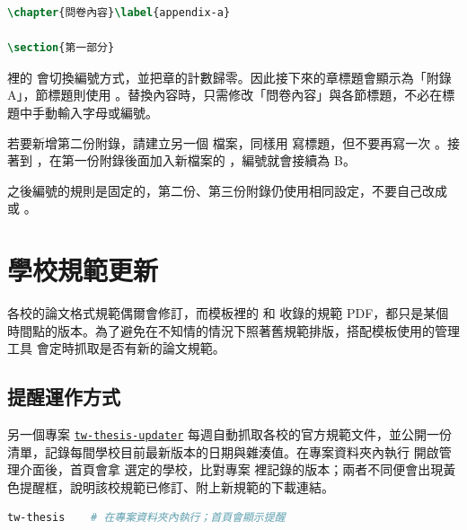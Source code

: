 \begin{lstlisting}[language=latex]
\chapter{問卷內容}\label{appendix-a}

\section{第一部分}
\end{lstlisting}

 裡的 \code{\appendix} 會切換編號方式，並把章的計數歸零。因此接下來的章標題會顯示為「附錄 A」，節標題則使用 。替換內容時，只需修改「問卷內容」與各節標題，不必在標題中手動輸入字母或編號。

若要新增第二份附錄，請建立另一個  檔案，同樣用 \code{\chapter} 寫標題，但不要再寫一次 \code{\appendix}。接著到 ，在第一份附錄後面加入新檔案的 \code{}，編號就會接續為 B。

\code{\appendix} 之後編號的規則是固定的，第二份、第三份附錄仍使用相同設定，不要自己改成  或 。

\section{學校規範更新}

各校的論文格式規範偶爾會修訂，而模板裡的  和  收錄的規範 PDF，都只是某個時間點的版本。為了避免在不知情的情況下照著舊規範排版，搭配模板使用的管理工具  會定時抓取是否有新的論文規範。

\subsection{提醒運作方式}

另一個專案 \href{https://github.com/TW-Thesis/tw-thesis-updater}{\texttt{tw-thesis-updater}} 每週自動抓取各校的官方規範文件，並公開一份清單，記錄每間學校目前最新版本的日期與雜湊值。在專案資料夾內執行  開啟管理介面後，首頁會拿  選定的學校，比對專案  裡記錄的版本；兩者不同便會出現黃色提醒框，說明該校規範已修訂、附上新規範的下載連結。

\begin{lstlisting}[language=bash]
tw-thesis    # 在專案資料夾內執行；首頁會顯示提醒
\end{lstlisting}

